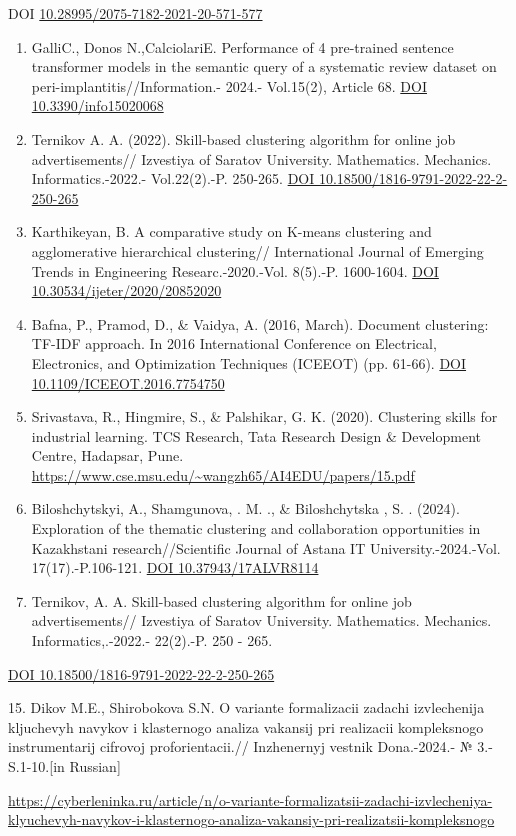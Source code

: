 \begin{references}
DOI
\href{http://dx.doi.org/10.28995/2075-7182-2021-20-571-577}{10.28995/2075-7182-2021-20-571-577}

\begin{enumerate}
\def\labelenumi{\arabic{enumi}.}
\setcounter{enumi}{7}
\item
  GalliC., Donos N.,CalciolariE. Performance of 4 pre-trained sentence
  transformer models in the semantic query of a systematic review
  dataset on peri-implantitis//Information.- 2024.- Vol.15(2), Article
  68. \href{https://doi.org/10.3390/info15020068}{DOI
  10.3390/info15020068}
\item
  Ternikov A. A. (2022). Skill-based clustering algorithm for online job
  advertisements// Izvestiya of Saratov University. Mathematics.
  Mechanics. Informatics.-2022.- Vol.22(2).-P. 250-265.
  \href{https://doi.org/10.18500/1816-9791-2022-22-2-250-265}{DOI
  10.18500/1816-9791-2022-22-2-250-265}
\item
  Karthikeyan, B. A comparative study on K-means clustering and
  agglomerative hierarchical clustering// International Journal of
  Emerging Trends in Engineering Researc.-2020.-Vol. 8(5).-P. 1600-1604.
  \href{https://doi.org/10.30534/ijeter/2020/20852020}{DOI
  10.30534/ijeter/2020/20852020}
\item
  Bafna, P., Pramod, D., \& Vaidya, A. (2016, March). Document
  clustering: TF-IDF approach. In 2016 International Conference on
  Electrical, Electronics, and Optimization Techniques (ICEEOT) (pp.
  61-66). \href{https://doi.org/10.1109/ICEEOT.2016.7754750}{DOI
  10.1109/ICEEOT.2016.7754750}
\item
  Srivastava, R., Hingmire, S., \& Palshikar, G. K. (2020). Clustering
  skills for industrial learning. TCS Research, Tata Research Design \&
  Development Centre, Hadapsar, Pune.
  \url{https://www.cse.msu.edu/~wangzh65/AI4EDU/papers/15.pdf}
\item
  Biloshchytskyi, A., Shamgunova, . M. ., \& Biloshchytska , S. .
  (2024). Exploration of the thematic clustering and collaboration
  opportunities in Kazakhstani research//Scientific Journal of Astana IT
  University.-2024.-Vol. 17(17).-P.106-121.
  \href{https://doi.org/10.37943/17ALVR8114}{DOI 10.37943/17ALVR8114}
\item
  Ternikov, A. A. Skill-based clustering algorithm for online job
  advertisements// Izvestiya of Saratov University. Mathematics.
  Mechanics. Informatics,.-2022.- 22(2).-P. 250 - 265.
\end{enumerate}

\href{https://doi.org/10.18500/1816-9791-2022-22-2-250-265}{DOI
10.18500/1816-9791-2022-22-2-250-265}

15. Dikov M.E., Shirobokova S.N. O variante formalizacii zadachi
izvlechenija kljuchevyh navykov i klasternogo analiza vakansij pri
realizacii kompleksnogo instrumentarij cifrovoj proforientacii.//
Inzhenernyj vestnik Dona.-2024.- № 3.- S.1-10.{[}in Russian{]}

\url{https://cyberleninka.ru/article/n/o-variante-formalizatsii-zadachi-izvlecheniya-klyuchevyh-navykov-i-klasternogo-analiza-vakansiy-pri-realizatsii-kompleksnogo}
\end{references}

